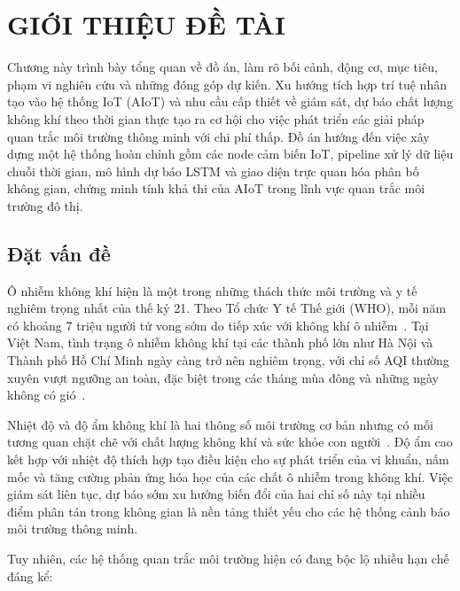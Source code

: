 \chapter{GIỚI THIỆU ĐỀ TÀI}
\label{chap:intro}

Chương này trình bày tổng quan về đồ án, làm rõ bối cảnh, động cơ, mục
tiêu, phạm vi nghiên cứu và những đóng góp dự kiến. Xu hướng tích hợp
trí tuệ nhân tạo vào hệ thống IoT (AIoT) và nhu cầu cấp thiết về giám
sát, dự báo chất lượng không khí theo thời gian thực tạo ra cơ hội cho
việc phát triển các giải pháp quan trắc môi trường thông minh với chi
phí thấp. Đồ án hướng đến việc xây dựng một hệ thống hoàn chỉnh gồm
các node cảm biến IoT, pipeline xử lý dữ liệu chuỗi thời gian, mô hình
dự báo LSTM và giao diện trực quan hóa phân bố không gian, chứng minh
tính khả thi của AIoT trong lĩnh vực quan trắc môi trường đô thị.

\section{Đặt vấn đề}
\label{sec:intro:problem}

Ô nhiễm không khí hiện là một trong những thách thức môi trường và y tế
nghiêm trọng nhất của thế kỷ 21. Theo Tổ chức Y tế Thế giới (WHO), mỗi
năm có khoảng 7 triệu người tử vong sớm do tiếp xúc với không khí ô
nhiễm~\cite{who2021air}. Tại Việt Nam, tình trạng ô nhiễm không khí tại
các thành phố lớn như Hà Nội và Thành phố Hồ Chí Minh ngày càng trở
nên nghiêm trọng, với chỉ số AQI thường xuyên vượt ngưỡng an toàn, đặc
biệt trong các tháng mùa đông và những ngày không có gió~\cite{vea2023}.

Nhiệt độ và độ ẩm không khí là hai thông số môi trường cơ bản nhưng có
mối tương quan chặt chẽ với chất lượng không khí và sức khỏe con
người~\cite{who2021air}. Độ ẩm cao kết hợp với nhiệt độ thích hợp tạo
điều kiện cho sự phát triển của vi khuẩn, nấm mốc và tăng cường phản
ứng hóa học của các chất ô nhiễm trong không khí. Việc giám sát liên
tục, dự báo sớm xu hướng biến đổi của hai chỉ số này tại nhiều điểm
phân tán trong không gian là nền tảng thiết yếu cho các hệ thống cảnh
báo môi trường thông minh.

Tuy nhiên, các hệ thống quan trắc môi trường hiện có đang bộc lộ nhiều
hạn chế đáng kể:

